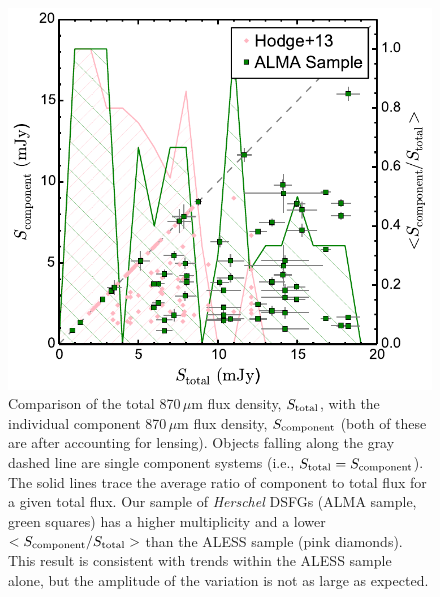 \documentclass[iop]{emulateapj}
\begin{document}
\begin{figure}[!tbp] 
\includegraphics[width=\linewidth]{../Figures/fluxtotalcomponent.pdf}

\caption{ Comparison of the total 870$\,\mu$m flux density, $S_{\rm total}$,
with the individual component 870$\,\mu$m flux density, $S_{\rm component}$
(both of these are after accounting for lensing).  Objects falling along the
gray dashed line are single component systems (i.e., $S_{\rm total} = S_{\rm
component}$).  The solid lines trace the average ratio of component to total
flux for a given total flux.  Our sample of {\it Herschel} DSFGs (ALMA sample,
green squares) has a higher multiplicity and a lower $<S_{\rm component}/S_{\rm
total}>$ than the ALESS sample (pink diamonds).  This result is consistent with
trends within the ALESS sample alone, but the amplitude of the variation is not
as large as expected.} \label{fig:componentflux}

\end{figure}

\end{document}
